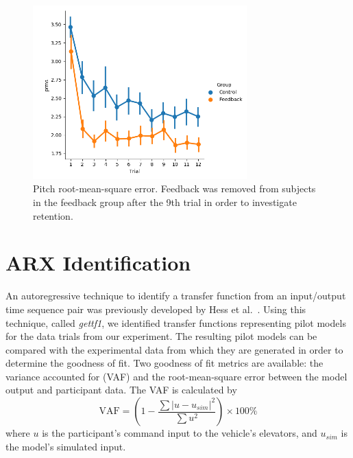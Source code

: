 \begin{figure}[t]
    \centering
    \includegraphics[width=3.25in]{figures/model_prms.png}
    \caption{Pitch root-mean-square error. Feedback was removed from subjects in the feedback group after the 9th trial in order to investigate retention.}
    \label{fig:prmse}
\end{figure}

\section{ARX Identification}

An autoregressive technique to identify a transfer function from an input/output time sequence pair was previously developed by Hess et al.~\cite{hess_modeling_2002}.
Using this technique, called \textit{gettf1}, we identified transfer functions representing pilot models for the data trials from our experiment.
The resulting pilot models can be compared with the experimental data from which they are generated in order to determine the goodness of fit.
Two goodness of fit metrics are available: the variance accounted for (VAF) and the root-mean-square error between the model output and participant data.
The VAF is calculated by
\begin{equation}
    \mbox{VAF} = \left( 1 - \dfrac{\sum{|u - u_{sim}|^2}} {\sum{u^2}} \right) \times \mbox{100\%}
\end{equation}
where $u$ is the participant's command input to the vehicle's elevators, and $u_{sim}$ is the model's simulated input.


